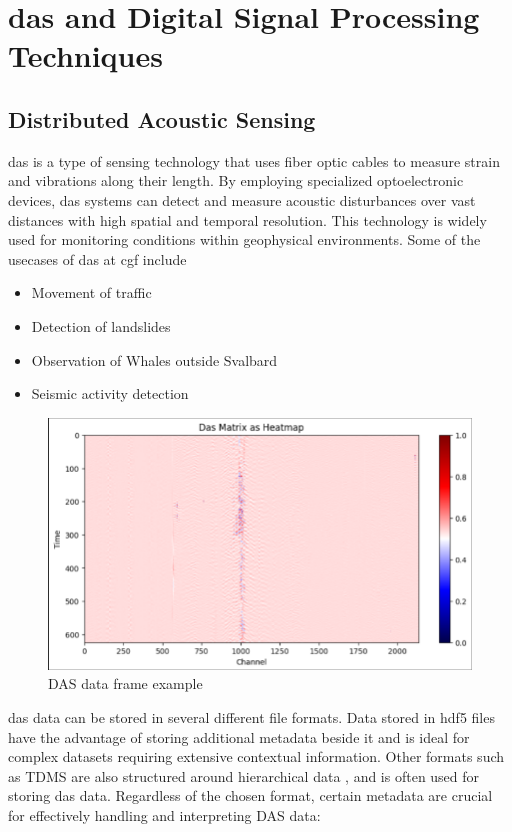 \section{\acrshort{das} and Digital Signal Processing Techniques}
\label{back:dsp}

\subsection{Distributed Acoustic Sensing}
\label{back:das}

\acrfull{das} is a type of sensing technology that uses fiber optic cables to measure strain and vibrations along their length. By employing specialized optoelectronic devices, \acrshort{das} systems can detect and measure acoustic disturbances over vast distances with high spatial and temporal resolution. This technology is widely used for monitoring conditions within geophysical environments. Some of the usecases of \acrshort{das} at \acrshort{cgf} include

\begin{itemize}
    \item Movement of traffic
    \item Detection of landslides
    \item Observation of Whales outside Svalbard
    \item Seismic activity detection
\end{itemize}


\begin{figure}[!h]
    \centering
    \includegraphics[width=0.7\linewidth]{figures/das_example.png}
    \caption{DAS data frame example}
    \label{fig:dasframe-ex}
\end{figure}

\acrshort{das} data can be stored in several different file formats. Data stored in \acrshort{hdf5} files have the advantage of storing additional metadata beside it and is ideal for complex datasets requiring extensive contextual information. Other formats such as TDMS are also structured around hierarchical data \cite{10.1145/800196.805973}, and is often used for storing \acrshort{das} data. Regardless of the chosen format, certain metadata are crucial for effectively handling and interpreting DAS data:

